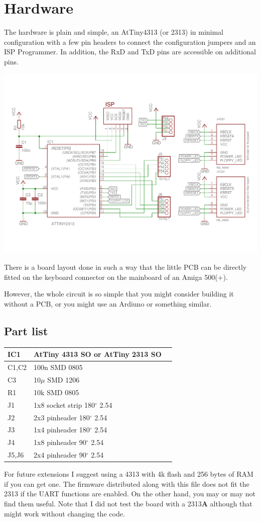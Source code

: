 \documentclass[DIV10]{scrartcl}
\begin{document}
\section{Hardware}
The hardware is plain and simple, an AtTiny4313 (or 2313) in
minimal configuration with a few pin headers to connect the
configuration jumpers and an ISP Programmer.
In addition, the RxD and TxD pins are accessible on additional
pins.
\begin{center}
  \includegraphics[width=.7\linewidth]{../hardware/schematic.pdf}
\end{center}
There is a board layout done in such a way that the little PCB can be
directly fitted on the keyboard connector on the mainboard of an Amiga
500(+).

However, the whole circuit is so simple that you might consider
building it without a PCB, or you might use an Ardiuno or something
similar. 

\subsection{Part list}
\begin{center}
  \begin{tabular}{|l|l|l|}
    \hline
    IC1 & AtTiny 4313 SO or AtTiny 2313 SO\\
    \hline
    C1,C2 & 100n SMD 0805 \\
    C3 & 10$\mu$ SMD 1206 \\
    R1 & 10k SMD 0805 \\
    \hline
    J1  & 1x8 socket strip 180$^\circ$ 2.54\\
    J2  & 2x3 pinheader 180$^\circ$ 2.54\\
    J3  & 1x4 pinheader 180$^\circ$ 2.54\\
    J4  & 1x8 pinheader 90$^\circ$ 2.54\\
    J5,J6  & 2x4 pinheader 90$^\circ$ 2.54\\
    \hline
  \end{tabular}
\end{center}
For future extensions I suggest using a 4313 with 4k flash and 256
bytes of RAM if you can get one. The firmware distributed along with
this file does not fit the 2313 if the UART functions are enabled. On the other
hand, you may or may not find them useful. Note that I did not
test the board with a 2313{\bfseries A} although that might work
without changing the code.
\end{document}
